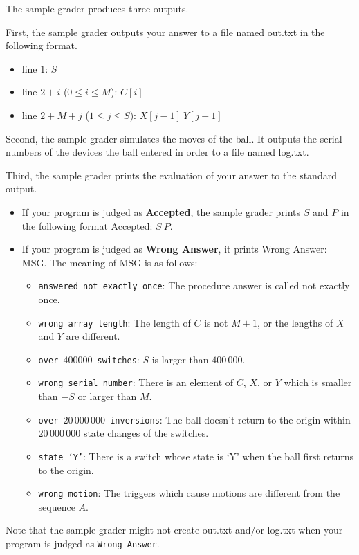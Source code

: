The sample grader produces three outputs.

First, the sample grader outputs your answer to a file named out.txt in the following
format.
\begin{itemize}
    \item line $1$: $S$
    \item line $2 + i$ ($0 \le i \le M$): $C[i]$
    \item line $2 + M + j$ ($1 \le j \le S$): $X[j-1]\ Y[j-1]$
\end{itemize}

Second, the sample grader simulates the moves of the ball. It outputs the serial
numbers of the devices the ball entered in order to a file named log.txt.

Third, the sample grader prints the evaluation of your answer to the standard output.

\begin{itemize}
    \item If your program is judged as \textbf{Accepted}, the sample grader prints $S$ and $P$ in the
following format Accepted: $S\ P$.
   \item If your program is judged as \textbf{Wrong Answer}, it prints Wrong Answer: MSG. The
meaning of MSG is as follows:
    \begin{itemize}
        \item \texttt{answered not exactly once}: The procedure answer is called not exactly
once.
\item \texttt{wrong array length}: The length of $C$ is not $M+1$, or the lengths of $X$ and $Y$
are different.
\item \texttt{over $400000$ switches}: $S$ is larger than $400\,000$.
\item \texttt{wrong serial number}: There is an element of $C$, $X$, or $Y$ which is smaller than
$-S$ or larger than $M$.
\item \texttt{over $20\,000\,000$ inversions}: The ball doesn't return to the origin within $20\,000\,000$ state changes of the switches.
\item \texttt{state `Y'}: There is a switch whose state is `Y' when the ball first returns to
the origin.
\item \texttt{wrong motion}: The triggers which cause motions are different from the
sequence $A$.
    \end{itemize}
\end{itemize}

Note that the sample grader might not create out.txt and/or log.txt when your
program is judged as \texttt{Wrong Answer}.